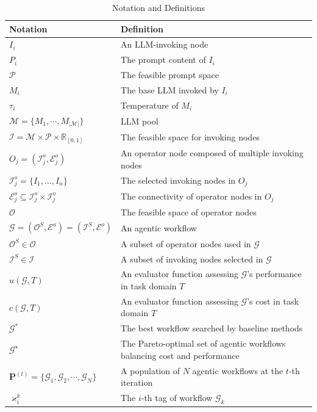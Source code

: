 \documentclass{article}
\theoremstyle{plain}
\theoremstyle{definition}
\theoremstyle{remark}
\begin{document}
\begin{table}[ht]
\centering
\caption{Notation and Definitions}
\begin{tabular}{ll}
\toprule
\textbf{Notation} & \textbf{Definition} \\
\midrule
$I_i$ & An LLM-invoking node \\
$P_i$ & The prompt content of $I_i$ \\
$\mathcal{P}$ & The feasible prompt space \\
$M_i$ & The base LLM invoked by $I_i$ \\
$\tau_i$ & Temperature of $M_i$ \\
$\mathcal{M} = \{M_1, \cdots, M_{|\mathcal{M}|}\}$ & LLM pool \\
$\mathcal{I} = \mathcal{M} \times \mathcal{P} \times \mathbb{R}_{[0,1]}$ & The feasible space for invoking nodes \\
$O_j = (\mathcal{I}^o_j, \mathcal{E}^o_j)$ & An operator node composed of multiple invoking nodes \\
$\mathcal{I}^o_j = \{I_1, \dots, I_n\}$ & The selected invoking nodes in $O_j$ \\
$\mathcal{E}^o_j \subseteq \mathcal{I}^o_j \times \mathcal{I}^o_j$ & The connectivity of operator nodes in $O_j$ \\
$\mathcal{O}$ & The feasible space of operator nodes \\
$\mathcal{G} = (\mathcal{O}^S, \mathcal{E}^a) = (\mathcal{I}^S, \mathcal{E}^o)$ & An agentic workflow \\
$\mathcal{O}^S \in \mathcal{O}$ & A subset of operator nodes used in $\mathcal{G}$ \\
$\mathcal{I}^S \in \mathcal{I}$ & A subset of invoking nodes selected in $\mathcal{G}$ \\
$u(\mathcal{G}, T)$ & An evaluator function assessing $\mathcal{G}$'s performance in task domain $T$ \\
$c(\mathcal{G}, T)$ & An evaluator function assessing $\mathcal{G}$'s cost in task domain $T$ \\
$\mathcal{G}^*$ & The best workflow searched by baseline methods \\
$\mathcal{G}^\star$ & The Pareto-optimal set of agentic workflows balancing cost and performance \\
$\mathbf{P}^{(t)} = \{\mathcal{G}_1, \mathcal{G}_2, \cdots, \mathcal{G}_N\}$ & A population of $N$ agentic workflows at the $t$-th iteration \\
$\varkappa^k_i$ & The $i$-th tag of workflow $\mathcal{G}_k$ \\

\end{tabular}
\end{table}
\end{document}
